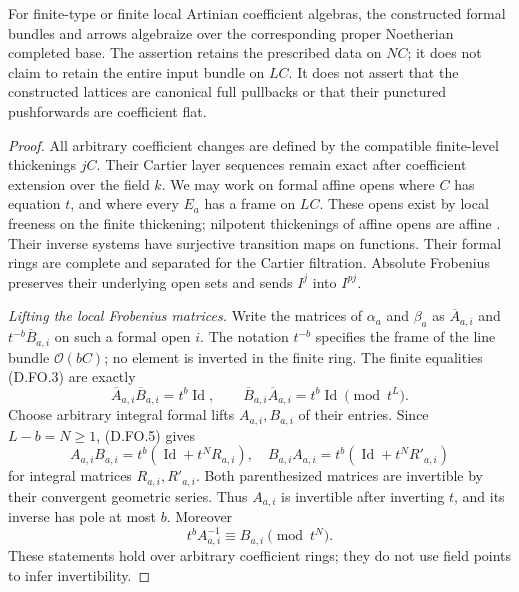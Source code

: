 \begin{proposition}
For finite-type or finite local Artinian coefficient
algebras, the constructed formal bundles and arrows
algebraize over the corresponding proper Noetherian
completed base. The assertion retains the prescribed
data on $NC$; it does not claim to retain the entire
input bundle on $LC$. It does not assert that the
constructed lattices are canonical full pullbacks or
that their punctured pushforwards are coefficient flat.
\end{proposition}

\begin{proof}
All arbitrary coefficient changes are defined by the
compatible finite-level thickenings $jC$. Their Cartier
layer sequences remain exact after coefficient extension
over the field $k$. We may work on formal affine opens
where $C$ has equation $t$, and where every $E_a$ has a
frame on $LC$. These opens exist by local freeness on
the finite thickening; nilpotent thickenings of affine
opens are affine
\citep[Lemma 37.2.3, Tag 06AD]{C_StacksFiniteObjectAffineness}.
Their inverse systems have surjective
transition maps on functions. Their formal rings are
complete and separated for the Cartier filtration.
Absolute Frobenius preserves their underlying open
sets and sends $I^j$ into $I^{pj}$.

\emph{Lifting the local Frobenius matrices.}
Write the matrices of $\alpha_a$ and $\beta_a$ as
$\overline A_{a,i}$ and $t^{-b}\overline B_{a,i}$ on
such a formal open $i$. The notation $t^{-b}$ specifies
the frame of the line bundle $\mathcal O(bC)$; no
element is inverted in the finite ring. The finite
equalities (D.FO.3) are exactly
\[
 \overline A_{a,i}\overline B_{a,i}=t^b\operatorname{Id},
 \qquad
 \overline B_{a,i}\overline A_{a,i}=t^b\operatorname{Id}
                  \pmod {t^L}.                       \tag{D.FO.5}
\]
Choose arbitrary integral formal lifts $A_{a,i},B_{a,i}$
of their entries. Since $L-b=N\ge1$, (D.FO.5) gives
\[
 A_{a,i}B_{a,i}=t^b(\operatorname{Id}+t^N R_{a,i}),
 \quad
 B_{a,i}A_{a,i}=t^b(\operatorname{Id}+t^N R'_{a,i})      \tag{D.FO.6}
\]
for integral matrices $R_{a,i},R'_{a,i}$. Both parenthesized
matrices are invertible by their convergent geometric
series. Thus $A_{a,i}$ is invertible after inverting $t$,
and its inverse has pole at most $b$. Moreover
\[
          t^b A_{a,i}^{-1}\equiv B_{a,i}\pmod {t^N}.    \tag{D.FO.7}
\]
These statements hold over arbitrary coefficient rings;
they do not use field points to infer invertibility.


\end{proof}
